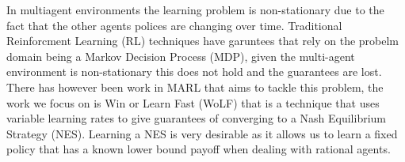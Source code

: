 \documentclass[conference]{IEEEtran}
\begin{document}
%
%
%
%

In multiagent environments the learning problem is non-stationary due to the fact that the other agents polices are changing over time. Traditional Reinforcment Learning (RL) techniques have garuntees that rely on the probelm domain being a Markov Decision Process (MDP), given the multi-agent environment is non-stationary this does not hold and the guarantees are lost. There has however been work in MARL that aims to tackle this problem, the work we focus on is Win or Learn Fast (WoLF) that is a technique that uses variable learning rates to give guarantees of converging to a Nash Equilibrium Strategy (NES). Learning a NES is very desirable as it allows us to learn a fixed policy that has a known lower bound payoff when dealing with rational agents.
\end{document}

